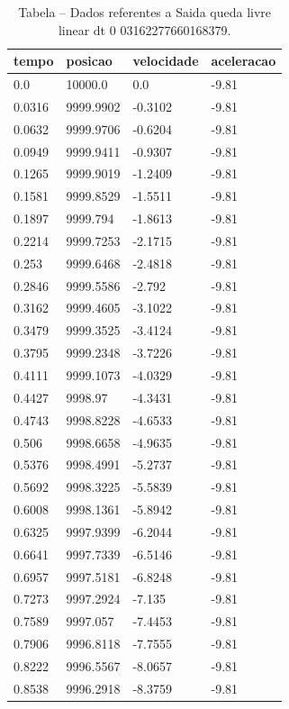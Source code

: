 \begin{table}[H]
\centering
\caption{Tabela – Dados referentes a Saida queda livre linear dt 0 03162277660168379.}
\label{tab:saida_queda_livre_linear_dt_0_03162277660168379}
\begin{tabular}{llll}
\toprule
tempo & posicao & velocidade & aceleracao \\
\midrule
0.0 & 10000.0 & 0.0 & -9.81 \\
0.0316 & 9999.9902 & -0.3102 & -9.81 \\
0.0632 & 9999.9706 & -0.6204 & -9.81 \\
0.0949 & 9999.9411 & -0.9307 & -9.81 \\
0.1265 & 9999.9019 & -1.2409 & -9.81 \\
0.1581 & 9999.8529 & -1.5511 & -9.81 \\
0.1897 & 9999.794 & -1.8613 & -9.81 \\
0.2214 & 9999.7253 & -2.1715 & -9.81 \\
0.253 & 9999.6468 & -2.4818 & -9.81 \\
0.2846 & 9999.5586 & -2.792 & -9.81 \\
0.3162 & 9999.4605 & -3.1022 & -9.81 \\
0.3479 & 9999.3525 & -3.4124 & -9.81 \\
0.3795 & 9999.2348 & -3.7226 & -9.81 \\
0.4111 & 9999.1073 & -4.0329 & -9.81 \\
0.4427 & 9998.97 & -4.3431 & -9.81 \\
0.4743 & 9998.8228 & -4.6533 & -9.81 \\
0.506 & 9998.6658 & -4.9635 & -9.81 \\
0.5376 & 9998.4991 & -5.2737 & -9.81 \\
0.5692 & 9998.3225 & -5.5839 & -9.81 \\
0.6008 & 9998.1361 & -5.8942 & -9.81 \\
0.6325 & 9997.9399 & -6.2044 & -9.81 \\
0.6641 & 9997.7339 & -6.5146 & -9.81 \\
0.6957 & 9997.5181 & -6.8248 & -9.81 \\
0.7273 & 9997.2924 & -7.135 & -9.81 \\
0.7589 & 9997.057 & -7.4453 & -9.81 \\
0.7906 & 9996.8118 & -7.7555 & -9.81 \\
0.8222 & 9996.5567 & -8.0657 & -9.81 \\
0.8538 & 9996.2918 & -8.3759 & -9.81 \\

\end{tabular}
\end{table}
